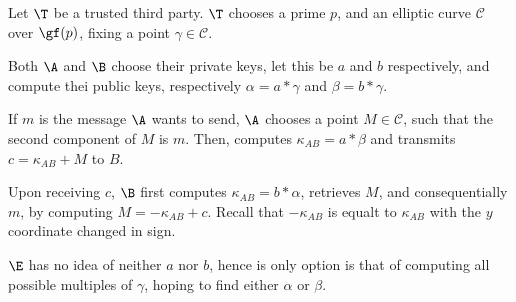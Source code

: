 \documentclass{subfiles}
\begin{document}
    \begin{procedure}
        \caption{Elliptic-ElGamal()}\label{proc:ElGamal-on-elliptic-curves}
        \nl Let $\T$ be a trusted third party. $\T$ chooses a prime \(p\),
            and an elliptic curve \(\mathcal{C}\) over \(\gf(p)\),
            fixing a point \(\gamma \in \mathcal{C}\).
            \DontPrintSemicolon\;

        \nl Both $\A$ and $\B$ choose their private keys, let this be \(a\) and \(b\) respectively,
            and compute thei public keys, respectively $\alpha = a * \gamma$ and $\beta = b * \gamma$.
            \DontPrintSemicolon\;
        
        \nl If $m$ is the message $\A$ wants to send, $\A$ chooses a point $M \in \mathcal{C}$,
            such that the second component of $M$ is $m$. Then,
            computes $\kappa_{AB} = a * \beta$ and transmits $c = \kappa_{AB} + M$ to $B$.
            \DontPrintSemicolon\;

        \nl Upon receiving $c$, $\B$ first computes $\kappa_{AB} = b * \alpha$,
            retrieves $M$, and consequentially $m$, by computing $M = -\kappa_{AB} + c$.
            Recall that $-\kappa_{AB}$ is equalt to $\kappa_{AB}$ with the $y$ coordinate changed in sign.
            \DontPrintSemicolon\;

        \nl $\E$ has no idea of neither $a$ nor $b$,
            hence is only option is that of computing all possible multiples of $\gamma$,
            hoping to find either $\alpha$ or $\beta$.

    \end{procedure}
\end{document}
